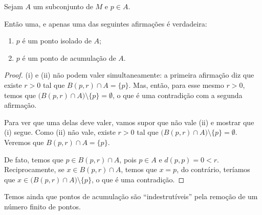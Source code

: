 \begin{proposition}
    Sejam $A$ um subconjunto de $M$ e $p \in A$.
    
    Então uma, e apenas uma das seguintes afirmações é verdadeira:
    \begin{enumerate}[label=(\roman*)]
        \item $p$ é um ponto isolado de $A$;
        \item $p$ é um ponto de acumulação de $A$.
    \end{enumerate}
\end{proposition}
\begin{proof}
    (i) e (ii) não podem valer simultaneamente:
    a primeira afirmação diz que existe $r>0$ tal que $B(p, r)\cap A = \{p\}$.
    Mas, então, para esse mesmo $r>0$, temos que $\bigl(B(p, r)\cap A\bigr)\setminus\{p\} = \emptyset$, o que é uma contradição com a segunda afirmação.

    Para ver que uma delas deve valer, vamos supor que não vale (ii) e mostrar que (i) segue.
    Como (ii) não vale, existe $r>0$ tal que $\bigl(B(p, r)\cap A\bigr)\setminus\{p\} = \emptyset$.
    Veremos que $B(p, r)\cap A = \{p\}$.

    De fato, temos que $p \in B(p, r)\cap A$, pois $p \in A$ e $d(p, p) = 0 < r$.
    Reciprocamente, se $x \in B(p, r)\cap A$, temos que $x=p$, do contrário, teríamos que $x \in \bigl(B(p, r)\cap A\bigr)\setminus\{p\}$, o que é uma contradição.
\end{proof}

Temos ainda que pontos de acumulação são ``indestrutíveis'' pela remoção de um número finito de pontos.

